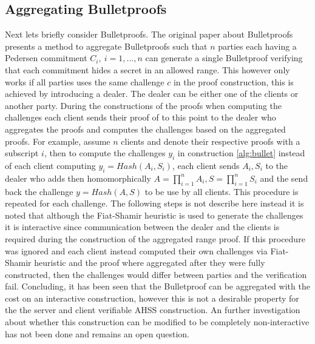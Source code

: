 \subsection*{Aggregating Bulletproofs}
Next lets briefly consider Bulletproofs. The original paper about Bulletproofs \cite{bulletProofs_theory} presents a method to aggregate Bulletproofs such that $n$ parties each having a Pedersen commitment $C_i,\: i=1,...,n$ can generate a single Bulletproof verifying that each commitment hides a secret in an allowed range. This however only works if all parties uses the same challenge $c$ in the proof construction, this is achieved by introducing a dealer. The dealer can be either one of the clients or another party. During the constructions of the proofs when computing the challenges each client sends their proof of to this point to the dealer who aggregates the proofs and computes the challenges based on the aggregated proofs. For example, assume $n$ clients and denote their respective proofs with a subscript $i$, then to compute the challenges $y_i$ in construction \ref{alg:bullet} instead of each client computing $y_i = Hash(A_i,S_i)$, each client sends $A_i,S_i$ to the dealer who adds then homomorphically $A = \prod_{i=1}^n A_i, S = \prod_{i=1}^n S_i$ and the send back the challenge $y =Hash(A,S)$ to be use by all clients. This procedure is repeated for each challenge. The following steps is not describe here instead it is noted that although the Fiat-Shamir heuristic is used to generate the challenges it is interactive since communication between the dealer and the clients is required during the construction of the aggregated range proof. If this procedure was ignored and each client instead computed their own challenges via Fiat-Shamir heuristic and the proof where aggregated after they were fully constructed,  then the challenges would differ between parties and the verification fail. Concluding, it has been seen that the  Bulletproof can be aggregated with the cost on an  interactive construction, however this is not a desirable property for the the server and client verifiable AHSS construction. An further investigation about whether this construction can be modified to be completely non-interactive  has not been done and remains an open question.  


